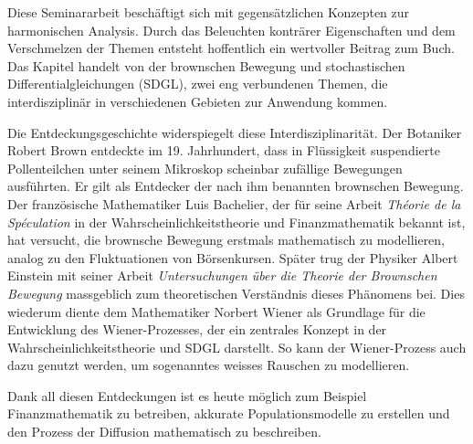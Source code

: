 %
%
%
%

Diese Seminararbeit beschäftigt sich mit gegensätzlichen Konzepten zur harmonischen Analysis. Durch das Beleuchten konträrer Eigenschaften und dem Verschmelzen der Themen entsteht hoffentlich ein wertvoller Beitrag zum Buch. Das Kapitel handelt von der brownschen Bewegung und stochastischen Differentialgleichungen (SDGL), zwei eng verbundenen Themen, die interdisziplinär in verschiedenen Gebieten zur Anwendung kommen.

Die Entdeckungsgeschichte widerspiegelt diese Interdisziplinarität. Der Botaniker Robert Brown entdeckte im 19. Jahrhundert, dass in Flüssigkeit suspendierte Pollenteilchen unter seinem Mikroskop scheinbar zufällige Bewegungen ausführten. Er gilt als Entdecker der nach ihm benannten brownschen Bewegung. Der französische Mathematiker Luis Bachelier, der für seine Arbeit \textit{Théorie de la Spéculation} \cite{bachelier1900théorie} in der Wahrscheinlichkeitstheorie und Finanzmathematik bekannt ist, hat versucht, die brownsche Bewegung erstmals mathematisch zu modellieren, analog zu den Fluktuationen von Börsenkursen. Später trug der Physiker Albert Einstein mit seiner Arbeit \textit{Untersuchungen über die Theorie der Brownschen Bewegung} \cite{einstein1922untersuchungen} massgeblich zum theoretischen Verständnis dieses Phänomens bei. Dies wiederum diente dem Mathematiker Norbert Wiener als Grundlage für die Entwicklung des Wiener-Prozesses, der ein zentrales Konzept in der Wahrscheinlichkeitstheorie und SDGL darstellt. So kann der Wiener-Prozess auch dazu genutzt werden, um sogenanntes weisses Rauschen zu modellieren.

Dank all diesen Entdeckungen ist es heute möglich zum Beispiel Finanzmathematik zu betreiben, akkurate Populationsmodelle zu erstellen und den Prozess der Diffusion mathematisch zu beschreiben. %
